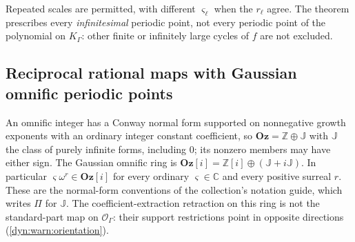 \documentclass[11pt,letterpaper]{article}
\theoremstyle{definition}
\theoremstyle{remark}
\newcommand{\C}{\mathbb C}
\newcommand{\Z}{\mathbb Z}
\newcommand{\OO}{\mathcal O}
\newcommand{\Oz}{\mathbf{Oz}}
\numberwithin{equation}{section}
\begin{document}
Repeated scales are permitted, with different $\varsigma_\ell$ when the
$r_\ell$ agree. The theorem prescribes every \emph{infinitesimal} periodic
point, not every periodic point of the polynomial on $K_\Gamma$: other finite
or infinitely large cycles of $f$ are not excluded.

\subsection{Reciprocal rational maps with Gaussian omnific periodic points}
\label{dyn:rd:subsec:omnific}

An omnific integer has a Conway normal form supported on nonnegative growth
exponents with an ordinary integer constant coefficient, so
$\Oz=\Z\oplus\mathbb J$ with $\mathbb J$ the class of purely infinite forms,
including $0$; its nonzero members may have either sign. The Gaussian
omnific ring is $\Oz[i]=\Z[i]\oplus(\mathbb J+i\mathbb J)$. In particular
$\varsigma\omega^{r}\in\Oz[i]$ for every ordinary $\varsigma\in\C$ and every
positive surreal $r$. These are the normal-form conventions of the
collection's notation guide, which writes $\Pi$ for $\mathbb J$. The
coefficient-extraction retraction on this ring is not the standard-part map
on $\OO_\Gamma$: their support restrictions point in opposite directions
(\cref{dyn:warn:orientation}).
\end{document}
